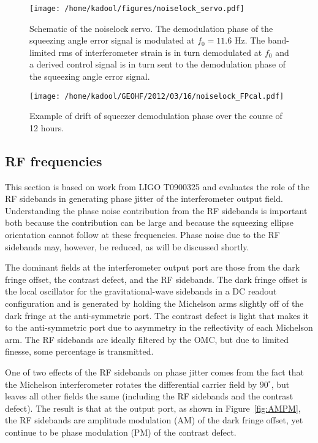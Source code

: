 \documentclass{ligodoc}
\begin{document}
\begin{figure}
\begin{centering}
\texttt{[image: /home/kadool/figures/noiselock\_servo.pdf]}
\caption{Schematic of the noiselock servo. The demodulation phase of
  the squeezing angle error signal is modulated at $f_0=11.6$ Hz. The
  band-limited rms of interferometer strain is in turn demodulated at
  $f_0$ and a derived control signal is in turn sent to the
  demodulation phase of the squeezing angle error signal.}
\label{fig:noiselockservo}
\end{centering}
\end{figure}


\begin{figure}
\begin{centering}
\texttt{[image: /home/kadool/GEOHF/2012/03/16/noiselock\_FPcal.pdf]}
\caption{Example of drift of squeezer demodulation phase over the
  course of 12 hours.}
\label{fig:noiselock}
\end{centering}
\end{figure}



\subsection{RF frequencies}
This section is based on work from LIGO T0900325 and evaluates the
role of the RF sidebands in generating phase jitter of the
interferometer output field. Understanding the phase noise
contribution from the RF sidebands is important both because the
contribution can be large and because the squeezing ellipse
orientation cannot follow at these frequencies. Phase noise due to the
RF sidebands may, however, be reduced, as will be discussed shortly.

The dominant fields at the interferometer output port are those from
the dark fringe offset, the contrast defect, and the RF sidebands. The
dark fringe offset is the local oscillator for the gravitational-wave
sidebands in a DC readout configuration and is generated by holding
the Michelson arms slightly off of the dark fringe at the
anti-symmetric port. The contrast defect is light that makes it to the
anti-symmetric port due to asymmetry in the reflectivity of each
Michelson arm. The RF sidebands are ideally filtered by the OMC, but
due to limited finesse, some percentage is transmitted.

One of two effects of the RF sidebands on phase jitter comes from the
fact that the Michelson interferometer rotates the differential
carrier field by $90^\circ$, but leaves all other fields the same
(including the RF sidebands and the contrast defect). The result is
that at the output port, as shown in Figure~\ref{fig:AMPM}, the RF
sidebands are amplitude modulation (AM) of the dark fringe offset, yet
continue to be phase modulation (PM) of the contrast defect.
\end{document}
